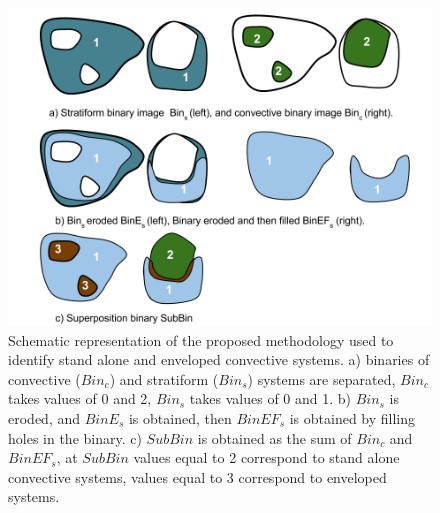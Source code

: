 \documentclass[preprint,12pt]{elsarticle}
\begin{document}
\begin{figure}[t]
\centering
    \includegraphics[width=12cm]{Figuras/Enveloped_Stand_Alone_Systems.png}
    \caption{Schematic representation of the proposed methodology used to identify stand alone and enveloped convective systems. a) binaries of convective ($Bin_c$) and stratiform ($Bin_s$) systems are separated, $Bin_c$ takes values of 0 and 2, $Bin_s$ takes values of 0 and 1.  b) $Bin_s$ is eroded, and $BinE_s$ is obtained, then $BinEF_s$ is obtained by filling holes in the binary.  c) $SubBin$ is obtained as the sum of $Bin_c$ and $BinEF_s$, at $SubBin$ values equal to 2 correspond to stand alone convective systems, values equal to 3 correspond to enveloped systems.}
    \label{fig:EnvelopedSeparation}
\end{figure}
\end{document}
